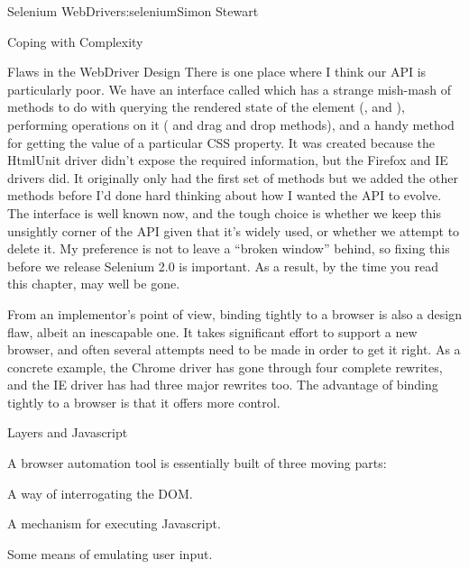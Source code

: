 \begin{aosachapter}{Selenium WebDriver}{s:selenium}{Simon Stewart}
\begin{aosasect1}{Coping with Complexity}
\begin{aosasect2}{Flaws in the WebDriver Design}
There is one place where I think our API is particularly poor. We have
an interface called  which has a strange
mish-mash of methods to do with querying the rendered state of the
element (,  and ),
performing operations on it ( and drag and drop methods),
and a handy method for getting the value of a particular CSS
property. It was created because the HtmlUnit driver didn't expose the
required information, but the Firefox and IE drivers did. It
originally only had the first set of methods but we added the other
methods before I'd done hard thinking about how I wanted the API to
evolve. The interface is well known now, and the tough choice is
whether we keep this unsightly corner of the API given that it's
widely used, or whether we attempt to delete it. My preference is not
to leave a ``broken window'' behind, so fixing this before we release
Selenium 2.0 is important.
As a result, by the time you read this chapter,
 may well be gone.

From an implementor's point of view, binding tightly to a browser is
also a design flaw, albeit an inescapable one. It takes significant
effort to support a new browser, and often several attempts need to be
made in order to get it right. As a concrete example, the Chrome
driver has gone through four complete rewrites, and the IE driver has
had three major rewrites too. The advantage of binding tightly to a
browser is that it offers more control.

\end{aosasect2}

\end{aosasect1}

\begin{aosasect1}{Layers and Javascript}
\label{sec.selenium.layers}

A browser automation tool is essentially built of three moving parts:

\begin{aosaitemize}

\item A way of interrogating the DOM.

\item A mechanism for executing Javascript.

\item Some means of emulating user input.

\end{aosaitemize}


\end{aosasect1}
\end{aosachapter}
